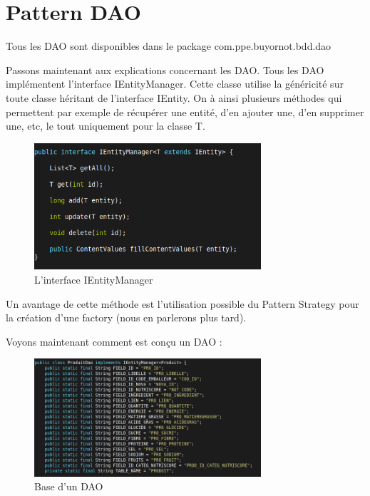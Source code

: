 \documentclass[report]{BetterDocument}
\begin{document}
		\section{Pattern DAO}

			Tous les DAO sont disponibles dans le package com.ppe.buyornot.bdd.dao

			Passons maintenant aux explications concernant les DAO. Tous les DAO implémentent l'interface IEntityManager. Cette classe utilise la généricité sur toute classe héritant de l'interface IEntity. On à ainsi plusieurs méthodes qui permettent par exemple de récupérer une entité, d'en ajouter une, d'en supprimer une, etc, le tout uniquement pour la classe T.

			\begin{figure}[H]
				\centering\includegraphics[width=0.75\textwidth, keepaspectratio]{img/bdd/ientitymanager.png}
				\caption{L'interface IEntityManager}
			\end{figure}

			Un avantage de cette méthode est l'utilisation possible du Pattern Strategy pour la création d'une factory (nous en parlerons plus tard).

			Voyons maintenant comment est conçu un DAO :

			\begin{figure}[H]
				\centering\includegraphics[width=0.75\textwidth, keepaspectratio]{img/bdd/dao_field.png}
				\caption{Base d'un DAO}
			\end{figure}
\end{document}
